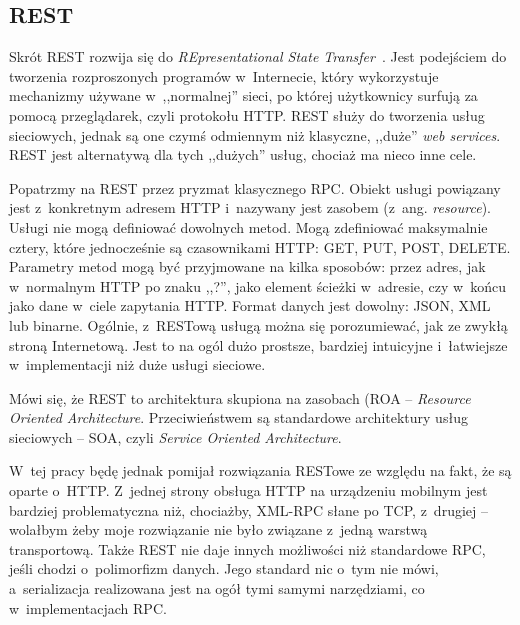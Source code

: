 %
%

\subsection{REST}
Skrót REST rozwija się do \emph{REpresentational State Transfer}~\cite{restful-web-services}.
Jest podejściem do tworzenia rozproszonych programów w~Internecie, który wykorzystuje mechanizmy używane w~,,normalnej'' sieci, po której użytkownicy surfują za pomocą przeglądarek, czyli protokołu HTTP.
REST służy do tworzenia usług sieciowych, jednak są one czymś odmiennym niż klasyczne, ,,duże'' \emph{web services}.
REST jest alternatywą dla tych ,,dużych'' usług, chociaż ma nieco inne cele.

Popatrzmy na REST przez pryzmat klasycznego RPC. Obiekt usługi powiązany jest z~konkretnym adresem HTTP i~nazywany jest zasobem (z~ang. \emph{resource}).
Usługi nie mogą definiować dowolnych metod. Mogą zdefiniować maksymalnie cztery, które jednocześnie są czasownikami HTTP: GET, PUT, POST, DELETE. 
Parametry metod mogą być przyjmowane na kilka sposobów: przez adres, jak w~normalnym HTTP po znaku ,,?'', jako element ścieżki w~adresie, czy w~końcu jako dane w~ciele zapytania HTTP.
Format danych jest dowolny: JSON, XML lub binarne.
Ogólnie, z~RESTową usługą można się porozumiewać, jak ze zwykłą stroną Internetową.
Jest to na ogól dużo prostsze, bardziej intuicyjne i~łatwiejsze w~implementacji niż duże usługi sieciowe.

Mówi się, że REST to architektura skupiona na zasobach (ROA -- \emph{Resource Oriented Architecture}. Przeciwieństwem są standardowe architektury usług sieciowych -- SOA, czyli \emph{Service Oriented Architecture}. 

W~tej pracy będę jednak pomijał rozwiązania RESTowe ze względu na fakt, że są oparte o~HTTP.
Z~jednej strony obsługa HTTP na urządzeniu mobilnym jest bardziej problematyczna niż, chociażby, XML-RPC słane po TCP, z~drugiej -- wolałbym żeby moje rozwiązanie nie było związane z~jedną warstwą transportową.
Także REST nie daje innych możliwości niż standardowe RPC, jeśli chodzi o~polimorfizm danych.
Jego standard nic o~tym nie mówi, a~serializacja realizowana jest na ogół tymi samymi narzędziami, co w~implementacjach RPC.

